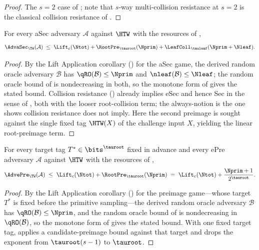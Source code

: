 \begin{proof}
The $s = 2$ case of ; \cite{BH22} note that $s$-way
multi-collision resistance at $s = 2$ is the classical collision resistance
of \cite{RS04}.
\end{proof}

\begin{theorem}
\label{thm:asec}
For every aSec adversary $\mathcal{A}$ against $\HTW$ with the resources
of ,
\[
  \AdvaSec_\TW(\mathcal{A})
  \;\leq\;
  \Lift_c(\Ntot)
  + \RootPre_{\tauroot}(\Nprim)
  + \LeafColl_{\tauleaf}(\Nprim+\Nleaf).
\]
\end{theorem}

\begin{proof}
By the Lift Application corollary () for the
aSec game, the derived random oracle adversary $\mathcal{B}$ has
$\qRO(\mathcal{B}) \leq \Nprim$ and $\nleaf(\mathcal{B}) \leq \Nleaf$; the
random oracle bound of  is nondecreasing in both, so the
monotone form of  gives the stated bound.
Collision resistance () already implies eSec and hence Sec
in the sense of \cite{RS04}, both with the looser root-collision term; the
always-notion is the one \cite{RS04} shows collision resistance does not
imply. Here the second preimage is sought against the single fixed tag
$\HTW(X)$ of the challenge input $X$, yielding the linear root-preimage
term.
\end{proof}

\begin{theorem}
\label{thm:epre}
For every target tag $T^* \in \bits^{\tauroot}$ fixed in advance and every
ePre adversary $\mathcal{A}$ against $\HTW$ with the resources of
,
\[
  \AdvePre_\TW(\mathcal{A})
  \;\leq\;
  \Lift_c(\Ntot) + \RootPre_{\tauroot}(\Nprim)
  \;=\;
  \Lift_c(\Ntot) + \frac{\Nprim + 1}{2^{\tauroot}}.
\]
\end{theorem}

\begin{proof}
By the Lift Application corollary () for the
preimage game---whose target $T^*$ is fixed before the primitive
sampling---the derived random oracle adversary $\mathcal{B}$ has
$\qRO(\mathcal{B}) \leq \Nprim$, and the random oracle bound of
 is nondecreasing in $\qRO(\mathcal{B})$, so the monotone
form of  gives the stated bound. With one fixed
target tag,  applies a candidate-preimage bound against
that target and drops the exponent from $\tauroot(s-1)$ to $\tauroot$.
\end{proof}

